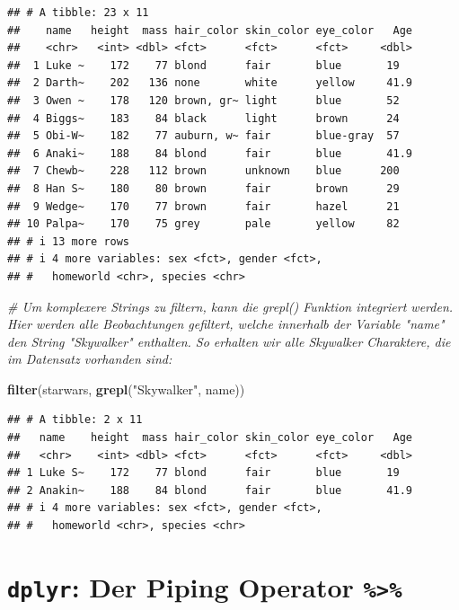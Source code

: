 \documentclass[
  ngerman,
]{book}
\newenvironment{Shaded}{\begin{snugshade}}{\end{snugshade}}
\newcommand{\CommentTok}[1]{\textcolor[rgb]{0.56,0.35,0.01}{\textit{#1}}}
\newcommand{\FunctionTok}[1]{\textcolor[rgb]{0.13,0.29,0.53}{\textbf{#1}}}
\newcommand{\NormalTok}[1]{#1}
\newcommand{\StringTok}[1]{\textcolor[rgb]{0.31,0.60,0.02}{#1}}
\begin{document}
\begin{verbatim}
## # A tibble: 23 x 11
##    name   height  mass hair_color skin_color eye_color   Age
##    <chr>   <int> <dbl> <fct>      <fct>      <fct>     <dbl>
##  1 Luke ~    172    77 blond      fair       blue       19  
##  2 Darth~    202   136 none       white      yellow     41.9
##  3 Owen ~    178   120 brown, gr~ light      blue       52  
##  4 Biggs~    183    84 black      light      brown      24  
##  5 Obi-W~    182    77 auburn, w~ fair       blue-gray  57  
##  6 Anaki~    188    84 blond      fair       blue       41.9
##  7 Chewb~    228   112 brown      unknown    blue      200  
##  8 Han S~    180    80 brown      fair       brown      29  
##  9 Wedge~    170    77 brown      fair       hazel      21  
## 10 Palpa~    170    75 grey       pale       yellow     82  
## # i 13 more rows
## # i 4 more variables: sex <fct>, gender <fct>,
## #   homeworld <chr>, species <chr>
\end{verbatim}

\begin{Shaded}
\begin{Highlighting}[]
\CommentTok{\# Um komplexere Strings zu filtern, kann die grepl() Funktion integriert werden. Hier werden alle Beobachtungen gefiltert, welche innerhalb der Variable "name" den String "Skywalker" enthalten. So erhalten wir alle Skywalker Charaktere, die im Datensatz vorhanden sind:}

\FunctionTok{filter}\NormalTok{(starwars, }\FunctionTok{grepl}\NormalTok{(}\StringTok{"Skywalker"}\NormalTok{, name))}
\end{Highlighting}
\end{Shaded}

\begin{verbatim}
## # A tibble: 2 x 11
##   name    height  mass hair_color skin_color eye_color   Age
##   <chr>    <int> <dbl> <fct>      <fct>      <fct>     <dbl>
## 1 Luke S~    172    77 blond      fair       blue       19  
## 2 Anakin~    188    84 blond      fair       blue       41.9
## # i 4 more variables: sex <fct>, gender <fct>,
## #   homeworld <chr>, species <chr>
\end{verbatim}

\section{\texorpdfstring{\texttt{dplyr}: Der Piping Operator \texttt{\%\textgreater{}\%}}{dplyr: Der Piping Operator \%\textgreater\%}}\label{dplyr-der-piping-operator}
\end{document}
